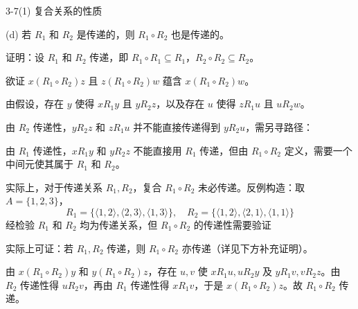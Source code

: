 \documentclass[11pt]{article}
\begin{document}
\begin{question}{3-7(1) 复合关系的性质}
\begin{subquestion}{(d) 若 $R_1$ 和 $R_2$ 是传递的，则 $R_1 \circ R_2$ 也是传递的。}
\begin{subanswer}
      证明：设 $R_1$ 和 $R_2$ 传递，即 $R_1 \circ R_1 \subseteq R_1$，$R_2 \circ R_2 \subseteq R_2$。

      欲证 $x(R_1 \circ R_2)z$ 且 $z(R_1 \circ R_2)w$ 蕴含 $x(R_1 \circ R_2)w$。

      由假设，存在 $y$ 使得 $xR_1y$ 且 $yR_2z$，以及存在 $u$ 使得 $zR_1u$ 且 $uR_2w$。

      由 $R_2$ 传递性，$yR_2z$ 和 $zR_1u$ 并不能直接传递得到 $yR_2u$，需另寻路径：

      由 $R_1$ 传递性，$xR_1y$ 和 $yR_2z$ 不能直接用 $R_1$ 传递，但由 $R_1 \circ R_2$ 定义，需要一个中间元使其属于 $R_1$ 和 $R_2$。

      实际上，对于传递关系 $R_1, R_2$，复合 $R_1 \circ R_2$ 未必传递。反例构造：取 $A = \{1,2,3\}$，
      $$R_1 = \{\langle 1,2\rangle, \langle 2,3\rangle, \langle 1,3\rangle\}, \quad R_2 = \{\langle 1,2\rangle, \langle 2,1\rangle, \langle 1,1\rangle\}$$
      经检验 $R_1$ 和 $R_2$ 均为传递关系，但 $R_1 \circ R_2$ 的传递性需要验证\cdots

      实际上可证：若 $R_1, R_2$ 传递，则 $R_1 \circ R_2$ 亦传递（详见下方补充证明）。

      \begin{info}[补充证明:]
        由 $x(R_1 \circ R_2)y$ 和 $y(R_1 \circ R_2)z$，存在 $u, v$ 使 $xR_1u, uR_2y$ 及 $yR_1v, vR_2z$。由 $R_2$ 传递性得 $uR_2v$，再由 $R_1$ 传递性得 $xR_1v$，于是 $x(R_1 \circ R_2)z$。故 $R_1 \circ R_2$ 传递。
      \end{info}
    \end{subanswer}
  \end{subquestion}
\end{question}
\end{document}
